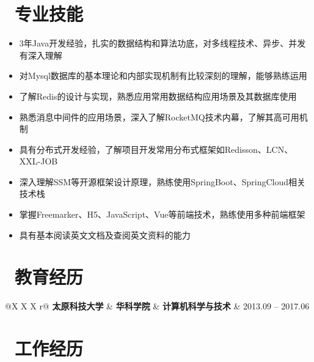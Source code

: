 \documentclass{resume}
\begin{document}
	
	
	\basicInfo{
		\phone{(+86) 131-6139-8723}
		\email{lyz0326@126.com}
		\faUser{ 24岁}
		}
		
	\section{\faCogs\ 专业技能}
	\begin{itemize}[parsep=0.5ex]
		\item 3年Java开发经验，扎实的数据结构和算法功底，对多线程技术、异步、并发有深入理解
		\item 对Mysql数据库的基本理论和内部实现机制有比较深刻的理解，能够熟练运用
		\item 了解Redis的设计与实现，熟悉应用常用数据结构应用场景及其数据库使用
		\item 熟悉消息中间件的应用场景，深入了解RocketMQ技术内幕，了解其高可用机制
		\item 具有分布式开发经验，了解项目开发常用分布式框架如Redisson、LCN、XXL-JOB
		\item 深入理解SSM等开源框架设计原理，熟练使用SpringBoot、SpringCloud相关技术栈
		\item 掌握Freemarker、H5、JavaScript、Vue等前端技术，熟练使用多种前端框架
		\item 具有基本阅读英文文档及查阅英文资料的能力
	\end{itemize}
	
	\section{\faGraduationCap\ 教育经历}

	\begin{tabularx}{\textwidth}{@{}X X X r@{}}
		\textbf{太原科技大学}  & \textbf{   华科学院     } & \textbf{ 计算机科学与技术 }  & 2013.09 -- 2017.06  \\
	\end{tabularx}
		
	
	\section{\faUsers\ 工作经历}
	
\end{document}
